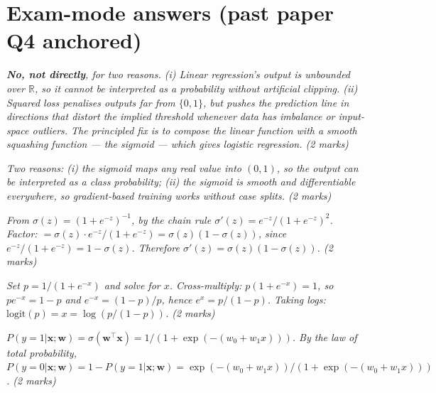 \documentclass[11pt, a4paper]{article}
\newcommand{\doflag}{\textcolor{defBd}{\textbf{[DO]}}\,}
\begin{document}
\section{Exam-mode answers (past paper Q4 anchored)}

\begin{exambox}
\textit{\textbf{No, not directly}, for two reasons. (i) Linear regression's output is unbounded over $\mathbb{R}$, so it cannot be interpreted as a probability without artificial clipping. (ii) Squared loss penalises outputs far from $\{0,1\}$, but pushes the prediction line in directions that distort the implied threshold whenever data has imbalance or input-space outliers. The principled fix is to compose the linear function with a smooth squashing function — the sigmoid — which gives logistic regression. (2 marks)}
\end{exambox}

\begin{exambox}
\textit{Two reasons: (i) the sigmoid maps any real value into $(0,1)$, so the output can be interpreted as a class probability; (ii) the sigmoid is smooth and differentiable everywhere, so gradient-based training works without case splits. (2 marks)}
\end{exambox}

\begin{exambox}[{\doflag{}(c): Derive $\sigma'(z)$.}]
\textit{From $\sigma(z) = (1+e^{-z})^{-1}$, by the chain rule $\sigma'(z) = e^{-z}/(1+e^{-z})^2$. Factor: $= \sigma(z)\cdot e^{-z}/(1+e^{-z}) = \sigma(z)(1-\sigma(z))$, since $e^{-z}/(1+e^{-z}) = 1-\sigma(z)$. Therefore $\sigma'(z) = \sigma(z)(1-\sigma(z))$. (2 marks)}
\end{exambox}

\begin{exambox}[{\doflag{}(d): Derive $\mathrm{logit}(p)$.}]
\textit{Set $p = 1/(1+e^{-x})$ and solve for $x$. Cross-multiply: $p(1+e^{-x}) = 1$, so $pe^{-x} = 1-p$ and $e^{-x} = (1-p)/p$, hence $e^x = p/(1-p)$. Taking logs: $\mathrm{logit}(p) = x = \log(p/(1-p))$. (2 marks)}
\end{exambox}

\begin{exambox}[{\doflag{}(e): With $z = \mathbf{w}^\top\mathbf{x}$, $\mathbf{w} = [w_0, w_1]^\top$, $\mathbf{x} = [1, x]^\top$, derive $P(y=1|\mathbf{x};\mathbf{w})$ and $P(y=0|\mathbf{x};\mathbf{w})$.}]
\textit{$P(y=1|\mathbf{x};\mathbf{w}) = \sigma(\mathbf{w}^\top\mathbf{x}) = 1/(1+\exp(-(w_0 + w_1 x)))$. By the law of total probability, $P(y=0|\mathbf{x};\mathbf{w}) = 1 - P(y=1|\mathbf{x};\mathbf{w}) = \exp(-(w_0+w_1 x))/(1+\exp(-(w_0+w_1 x)))$. (2 marks)}
\end{exambox}
\end{document}
